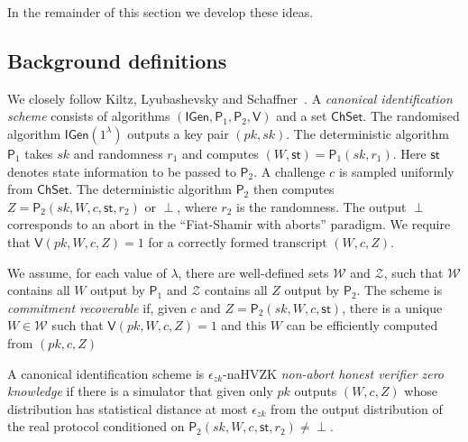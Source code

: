 \documentclass{llncs}
\newcommand{\IGen}{\mathsf{IGen}}
\newcommand{\PP}{\mathsf{P}}
\newcommand{\VV}{\mathsf{V}}
\newcommand{\Wset}{\mathcal{W}}
\newcommand{\Zset}{\mathcal{Z}}
\newcommand{\ChSet}{\textsf{ChSet}}
\newcommand{\St}{\textsf{st}}
\begin{document}
In the remainder of this section we develop these ideas.


\subsection{Background definitions} \label{sec:KLS-defns}

We closely follow Kiltz, Lyubashevsky and Schaffner~\cite{KLS18}.
A \emph{canonical identification scheme} consists of algorithms $(\IGen, \PP_1, \PP_2, \VV)$ and a set $\ChSet$. The randomised algorithm $\IGen( 1^\lambda )$ outputs a key pair $(pk,sk)$.
The deterministic algorithm $\PP_1$ takes $sk$ and randomness $r_1$ and computes $(W, \St) = \PP_1( sk, r_1 )$. 
Here $\St$ denotes state information to be passed to $\PP_2$.
A challenge $c$ is sampled uniformly from $\ChSet$. The deterministic algorithm $\PP_2$ then computes $Z = \PP_2( sk, W, c, \St, r_2 )$ or $\perp$, where $r_2$ is the randomness.
The output $\perp$ corresponds to an abort in the ``Fiat-Shamir with aborts'' paradigm.
We require that $\VV( pk, W, c, Z ) = 1$ for a correctly formed transcript $(W,c,Z)$.

We assume, for each value of $\lambda$, there are well-defined sets $\Wset$ and $\Zset$, such that $\Wset$ contains all $W$ output by $\PP_1$ and $\Zset$ contains all $Z$ output by $\PP_2$. 
The scheme is \emph{commitment recoverable} if, given $c$ and $Z = \PP_2( sk, W, c, \St )$, there is a unique $W \in \Wset$ such that $\VV( pk, W, c, Z ) = 1$ and this $W$ can be efficiently computed from $(pk, c, Z)$

A canonical identification scheme is $\epsilon_{zk}$-naHVZK \emph{non-abort honest verifier zero knowledge} if there is a simulator that given only $pk$ outputs $(W, c, Z)$ whose distribution has statistical distance at most $\epsilon_{zk}$ from the output distribution of the real protocol conditioned on $\PP_2( sk, W, c, \St, r_2 ) \ne \perp$.

\end{document}
